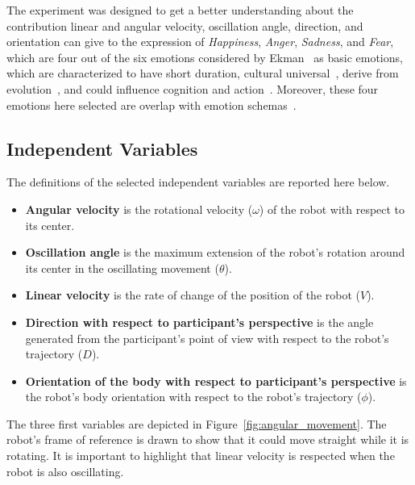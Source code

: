 
The experiment was designed to get a better understanding about the contribution linear and angular velocity, oscillation angle, direction, and orientation can give to the expression of \textit{Happiness}, \textit{Anger}, \textit{Sadness}, and \textit{Fear}, which are four out of the six emotions considered by Ekman~\cite{Ekman2004} as basic emotions, which are characterized to have short duration, cultural universal~\cite{Ekman94}, derive from evolution~\cite{Buck99}, and could influence cognition and action~\cite{Campos2004}. Moreover, these four emotions here selected are overlap with emotion schemas~\cite{Izard2007}.

\subsection{Independent Variables}

The definitions of the selected independent variables are reported here below.

\begin{itemize}
	\item \textbf{Angular velocity} is the rotational velocity  ($\omega$) of the robot with respect to its center.

	\item \textbf{Oscillation angle} is the maximum extension of the robot's rotation around its center in the oscillating movement ($\theta$).

	\item \textbf{Linear velocity} is the rate of change of the position of the robot ($V$). 

	\item \textbf{Direction with respect to participant's perspective} is the angle generated from the participant's point of view with respect to the robot's trajectory ($D$).

	\item \textbf{Orientation of the body with respect to participant's perspective} is the robot's body orientation with respect to the robot's trajectory ($\phi$).

\end{itemize}

The three first variables are depicted in Figure~\ref{fig:angular_movement}. The robot's frame of reference is drawn to show that it could move straight while it is rotating. It is important to highlight that linear velocity is respected when the robot is also oscillating.


